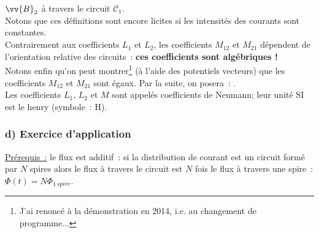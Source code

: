 \documentclass{article}
\renewcommand\overrightarrow{\vv}
\begin{document}
$\overrightarrow{B}_{2}$ à travers le circuit $\mathcal{C}_{1}$. \\
Notons que ces définitions sont encore licites si les intensités des
courants sont constantes. \\
Contrairement aux coefficients $L_{1}$ et $L_{2}$, les coefficients
$M_{12}$ et $M_{21}$ dépendent de l'orientation relative des
circuits : \textbf{ces coefficients sont algébriques !} \\
Notons enfin qu'on peut montrer\footnote{J'ai renoncé à la
démonstration en 2014, i.e. au changement de programme...} (à l'aide
des potentiels vecteurs) que les coefficients $M_{12}$ et $M_{21}$
sont égaux. Par la suite,
on posera : . \\
Les coefficients $L_{1}$, $L_{2}$ et $M$ sont appelés coefficients
de Neumann; leur unité SI est le henry (symbole : H).

\subsubsection*{d) Exercice d'application}
\underline{Prérequis :} le flux est additif : si la
distribution de courant est un circuit formé par $N$ spires alors le
flux à travers le circuit est $N$ fois le flux à travers une spire :
$\Phi\left(t\right) = N\Phi_{1\,spire}$.
\end{document}
